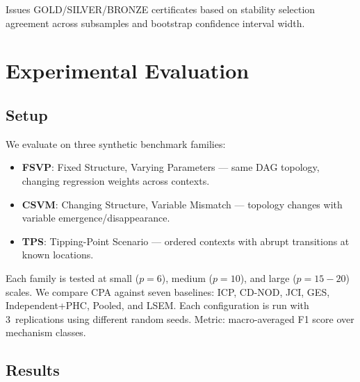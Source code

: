 \documentclass[11pt]{article}
\newcommand{\cpa}{\textsc{CPA}}
\begin{document}
Issues GOLD/SILVER/BRONZE certificates based on stability selection
agreement across subsamples and bootstrap confidence interval width.

\section{Experimental Evaluation}
\label{sec:experiments}

\subsection{Setup}

We evaluate on three synthetic benchmark families:
\begin{itemize}[nosep]
  \item \textbf{FSVP}: Fixed Structure, Varying Parameters --- same
    DAG topology, changing regression weights across contexts.
  \item \textbf{CSVM}: Changing Structure, Variable Mismatch --- topology
    changes with variable emergence/disappearance.
  \item \textbf{TPS}: Tipping-Point Scenario --- ordered contexts with
    abrupt transitions at known locations.
\end{itemize}

Each family is tested at small ($p{=}6$), medium ($p{=}10$), and large
($p{=}15{-}20$) scales. We compare \cpa{} against seven baselines:
ICP, CD-NOD, JCI, GES, Independent+PHC, Pooled, and LSEM. Each
configuration is run with 3~replications using different random seeds.
Metric: macro-averaged F1 score over mechanism classes.

\subsection{Results}
\end{document}
